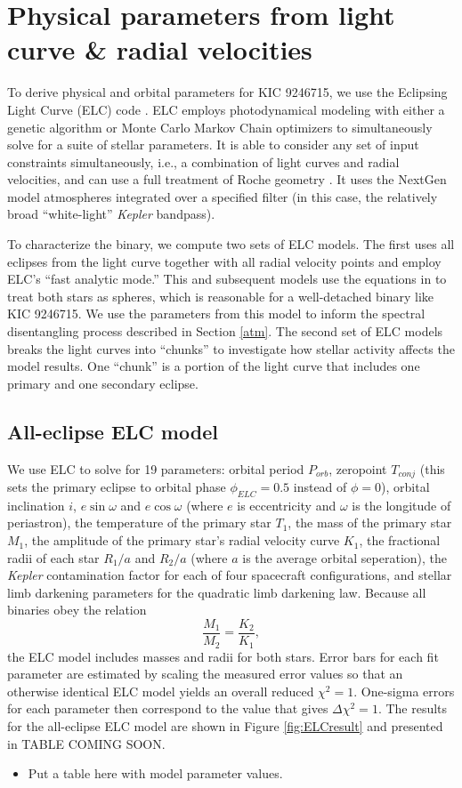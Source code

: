 \section{Physical parameters from light curve \& radial velocities}\label{model}
To derive physical and orbital parameters for KIC 9246715, we use the Eclipsing Light Curve (ELC) code \citep{oro00}. ELC employs photodynamical modeling with either a genetic algorithm or Monte Carlo Markov Chain optimizers to simultaneously solve for a suite of stellar parameters. It is able to consider any set of input constraints simultaneously, i.e., a combination of light curves and radial velocities, and can use a full treatment of Roche geometry \citep{kop69,avn75}. It uses the NextGen model atmospheres integrated over a specified filter (in this case, the relatively broad ``white-light'' \emph{Kepler} bandpass).

To characterize the binary, we compute two sets of ELC models. The first uses all eclipses from the light curve together with all radial velocity points and employ ELC's ``fast analytic mode.'' This and subsequent models use the equations in \citet{man02} to treat both stars as spheres, which is reasonable for a well-detached binary like KIC 9246715. We use the parameters from this model to inform the spectral disentangling process described in Section \ref{atm}. The second set of ELC models breaks the light curves into ``chunks'' to investigate how stellar activity affects the model results. One ``chunk'' is a portion of the light curve that includes one primary and one secondary eclipse.

\subsection{All-eclipse ELC model}

We use ELC to solve for 19 parameters: orbital period $P_{orb}$, zeropoint $T_{conj}$ (this sets the primary eclipse to orbital phase $\phi_{ELC} = 0.5$ instead of $\phi = 0$), orbital inclination $i$, $e \sin \omega$ and $e \cos \omega$ (where $e$ is eccentricity and $\omega$ is the longitude of periastron), the temperature of the primary star $T_1$, the mass of the primary star $M_1$, the amplitude of the primary star's radial velocity curve $K_1$, the fractional radii of each star $R_1/a$ and $R_2/a$ (where $a$ is the average orbital seperation), the \emph{Kepler} contamination factor for each of four spacecraft configurations, and stellar limb darkening parameters for the quadratic limb darkening law. Because all binaries obey the relation
\begin{equation}
\frac{M_1}{M_2} = \frac{K_2}{K_1},
\end{equation}
the ELC model includes masses and radii for both stars. Error bars for each fit parameter are estimated by scaling the measured error values so that an otherwise identical ELC model yields an overall reduced $\chi^2 = 1$. One-sigma errors for each parameter then correspond to the value that gives $\Delta \chi^2 = 1$. The results for the all-eclipse ELC model are shown in Figure \ref{fig:ELCresult} and presented in TABLE COMING SOON.

\begin{itemize}
\item Put a table here with model parameter values.
\end{itemize}

